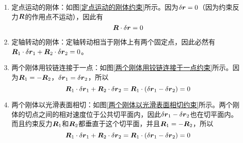 \begin{enumerate}
\item 定点运动的刚体：如图\ref{定点运动的刚体约束}所示。因为$\delta\boldsymbol{r}=0$（因为约束反力$\boldsymbol{R}$的作用点不运动），因此有
\begin{equation*}
	\boldsymbol{R} \cdot \delta \boldsymbol{r} = 0
\end{equation*}
\item 定轴转动的刚体：定轴转动相当于刚体上有两个固定点，因此必然有$\boldsymbol{R}_1 \cdot \delta \boldsymbol{r}_1+\boldsymbol{R}_2 \cdot \delta \boldsymbol{r}_2 = 0$。
\item 两个刚体用铰链连接于一点：如图\ref{两个刚体用铰链连接于一点约束}所示。因为$\boldsymbol{R}_1=-\boldsymbol{R}_2$，$\delta\boldsymbol{r}_1=\delta\boldsymbol{r}_2$，所以
\begin{equation*}
	\boldsymbol{R}_1 \cdot \delta \boldsymbol{r}_1+\boldsymbol{R}_2 \cdot \delta \boldsymbol{r}_2 = \boldsymbol{R}_1\cdot (\delta \boldsymbol{r}_1-\delta\boldsymbol{r}_2) = 0
\end{equation*}
\item 两个刚体以光滑表面相切：如图\ref{两个刚体以光滑表面相切约束}所示。两个刚体的切点之间的相对速度位于公共切平面内，因此$\delta\boldsymbol{r}_1-\delta\boldsymbol{r}_2$也在切平面内。而且约束反力$\boldsymbol{R}_1$和$\boldsymbol{R}_2$都垂直于这个切平面，并且$\boldsymbol{R}_1=-\boldsymbol{R}_2$，所以
\begin{equation*}
	\boldsymbol{R}_1 \cdot \delta \boldsymbol{r}_1+\boldsymbol{R}_2 \cdot \delta \boldsymbol{r}_2 = \boldsymbol{R}_1\cdot (\delta \boldsymbol{r}_1-\delta\boldsymbol{r}_2) = 0
\end{equation*}


\end{enumerate}
